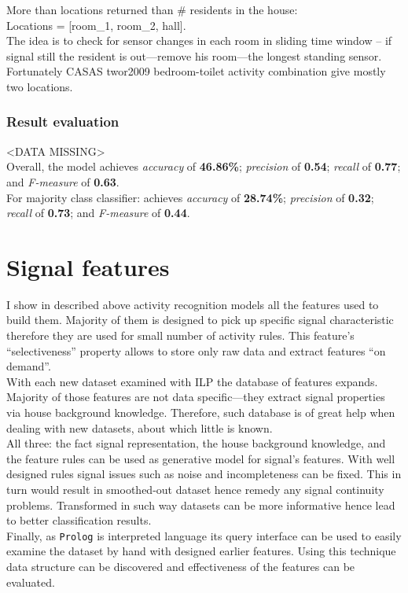 \documentclass[10pt, a4paper, pdflatex, leqno, twoside, openright]{report}
\begin{document}
More than locations returned than \# residents in the house:\\
Locations = [room\_1, room\_2, hall].\\
The idea is to check for sensor changes in each room in sliding time window -- if signal still the resident is out---remove his room---the longest standing sensor.\\
Fortunately CASAS twor2009 bedroom-toilet activity combination give mostly two locations.

      \subsubsection{Result evaluation}
<DATA MISSING>\\
Overall, the model achieves \emph{accuracy} of \textbf{46.86\%}; \emph{precision} of \textbf{0.54}; \emph{recall} of \textbf{0.77}; and \emph{F-measure} of \textbf{0.63}.\\

For majority class classifier: achieves \emph{accuracy} of \textbf{28.74\%}; \emph{precision} of \textbf{0.32}; \emph{recall} of \textbf{0.73}; and \emph{F-measure} of \textbf{0.44}.

  \section{Signal features\label{sec:single:features}\label{sec:multiple:features}}
I show in described above activity recognition models all the features used to build them. Majority of them is designed to pick up specific signal characteristic therefore they are used for small number of activity rules. This feature's ``selectiveness'' property allows to store only raw data and extract features ``on demand''.\\
With each new dataset examined with ILP the database of features expands. Majority of those features are not data specific---they extract signal properties via house background knowledge. Therefore, such database is of great help when dealing with new datasets, about which little is known.\\

All three: the fact signal representation, the house background knowledge, and the feature rules can be used as generative model for signal's features. With well designed rules signal issues such as noise and incompleteness can be fixed. This in turn would result in smoothed-out dataset hence remedy any signal continuity problems. Transformed in such way datasets can be more informative hence lead to better classification results.\\
Finally, as \texttt{Prolog} is interpreted language its query interface can be used to easily examine the dataset by hand with designed earlier features. Using this technique data structure can be discovered and effectiveness of the features can be evaluated.
\end{document}
